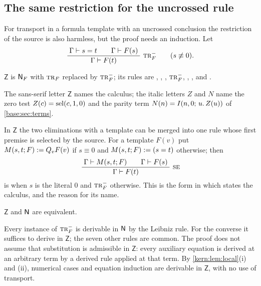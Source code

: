 \subsection{The same restriction for the uncrossed rule}
\label{kern:sec:dispatch}

For transport in a formula template with an uncrossed conclusion the
restriction of the source is also harmless, but the proof needs an induction.
Let
\[
 \infrule{\Gamma\proves s=t\qquad\Gamma\proves F(s)}
         {\Gamma\proves F(t)}\ \rulename{Tr}_{F}^{-}
 \qquad(s\not\equiv 0).
\]

\begin{definition}
\label{kern:def:Z}
$\mathsf{Z}$ is $\mathsf{N}_{F}$ with $\rulename{Tr}_{F}$ replaced by
$\rulename{Tr}_{F}^{-}$; its rules are , ,
, $\rulename{Tr}_{F}^{-}$, , ,
 and .
\end{definition}

The sans-serif letter $\mathsf{Z}$ names the calculus; the italic letters
$Z$ and $N$ name the zero test $Z(c)=\operatorname{sel}(c,1,0)$ and the parity term
$N(n)=I(n,0;\,u.\,Z(u))$ of \cref{base:sec:terms}.

In $\mathsf{Z}$ the two eliminations with a template can be merged into one
rule whose first premise is selected by the source.  For a template $F(v)$
put $M(s,t;F)\mathrel{:=}Q_{v}F(v)$ if $s\equiv 0$ and $M(s,t;F)\mathrel{:=}(s=t)$
otherwise; then
\[
 \infrule{\Gamma\proves M(s,t;F)\qquad\Gamma\proves F(s)}
         {\Gamma\proves F(t)}\ \rulename{SE}
\]
is  when $s$ is the literal $0$ and $\rulename{Tr}_{F}^{-}$
otherwise.  This is the form in which  states the
calculus, and the reason for its name.

\begin{theorem}
\label{kern:thm:dispatch}
$\mathsf{Z}$ and $\mathsf{N}$ are equivalent.
\end{theorem}

Every instance of $\rulename{Tr}_{F}^{-}$ is derivable in $\mathsf{N}$ by the
Leibniz rule.  For the converse it suffices to derive  in
$\mathsf{Z}$; the seven other rules are common.  The proof does not assume
that substitution is admissible in $\mathsf{Z}$: every auxiliary equation is
derived at an arbitrary term by a derived rule applied at that term.  By
\cref{kern:lem:local}(i) and (ii), numerical cases and equation induction
are derivable in $\mathsf{Z}$, with no use of transport.

